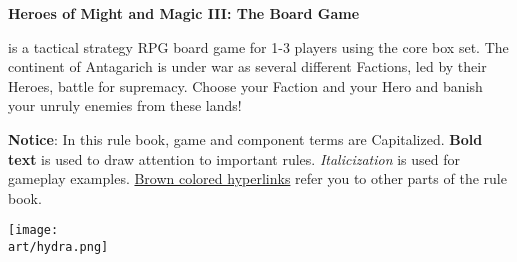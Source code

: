 
\bigbreak

\hypertarget{Heroes of Might and Magic III}{\textbf{Heroes of Might and Magic III: The Board Game}} is a tactical strategy RPG board game for 1-3 players using the core box set.
The continent of Antagarich is under war as several different Factions, led by their Heroes, battle for supremacy. Choose your Faction and your Hero and banish your unruly enemies from these lands!

\begin{multicols}{2}
\textbf{Notice}: In this rule book, game and component terms are Capitalized.
\textbf{Bold text} is used to draw attention to important rules.
\textit{Italicization} is used for gameplay examples.
\hyperlink{Heroes of Might and Magic III}{Brown colored hyperlinks} refer you to other parts of the rule book.
\vfill
\columnbreak
{}
\vfill
\end{multicols}

\begin{scaledfigure}[blanker]
  \centering
  \texttt{[image: \\art/hydra.png]}
\end{scaledfigure}
